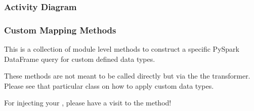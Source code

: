 \documentclass[a4paper,10pt, twoside,english]{sphinxmanual}
\begin{document}
\subsubsection{Activity Diagram}
\label{\detokenize{transformer/mapper:activity-diagram}}
\noindent{}


\subsubsection{Custom Mapping Methods}
\label{\detokenize{transformer/mapper:module-spooq2.transformer.mapper_custom_data_types}}\label{\detokenize{transformer/mapper:custom-mapping-methods}}
This is a collection of module level methods to construct a specific
PySpark DataFrame query for custom defined data types.

These methods are not meant to be called directly but via the
the {\hyperref[\detokenize{transformer/mapper:spooq2.transformer.mapper.Mapper}]{}} transformer.
Please see that particular class on how to apply custom data types.

For injecting your , please have a visit to the
{\hyperref[\detokenize{transformer/mapper:spooq2.transformer.mapper_custom_data_types.add_custom_data_type}]{}} method!
\end{document}
